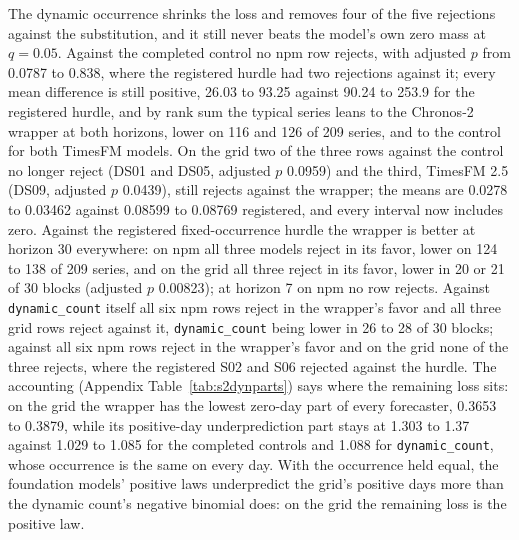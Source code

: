 The dynamic occurrence shrinks the loss and removes four of the five rejections against the substitution,
and it still never beats the model's own zero mass at $q = 0.05$. Against the completed control no npm row
rejects, with adjusted $p$ from 0.0787 to 0.838, where the registered hurdle had two rejections against it;
every mean difference is still positive, 26.03 to 93.25 against 90.24 to 253.9 for the registered hurdle,
and by rank sum the typical series leans to the Chronos-2 wrapper at both horizons, lower on 116 and 126 of
209 series, and to the control for both TimesFM models. On the grid two of the three rows against the
control no longer reject (DS01 and DS05, adjusted $p$ 0.0959) and the third, TimesFM 2.5 (DS09, adjusted $p$
0.0439), still rejects against the wrapper; the means are 0.0278 to 0.03462 against 0.08599 to 0.08769
registered, and every interval now includes zero. Against the registered fixed-occurrence hurdle the wrapper
is better at horizon 30 everywhere: on npm all three models reject in its favor, lower on 124 to 138 of 209
series, and on the grid all three reject in its favor, lower in 20 or 21 of 30 blocks (adjusted $p$
0.00823); at horizon 7 on npm no row rejects. Against \texttt{dynamic\_count} itself all six npm rows reject
in the wrapper's favor and all three grid rows reject against it, \texttt{dynamic\_count} being lower in 26
to 28 of 30 blocks; against \hc{} all six npm rows reject in the wrapper's favor and on the grid none of the
three rejects, where the registered S02 and S06 rejected against the hurdle. The accounting (Appendix
Table~\ref{tab:s2dynparts}) says where the remaining loss sits: on the grid the wrapper has the lowest
zero-day part of every forecaster, 0.3653 to 0.3879, while its positive-day underprediction part stays at
1.303 to 1.37 against 1.029 to 1.085 for the completed controls and 1.088 for \texttt{dynamic\_count}, whose
occurrence is the same on every day. With the occurrence held equal, the foundation models' positive laws
underpredict the grid's positive days more than the dynamic count's negative binomial does: on the grid the
remaining loss is the positive law.

